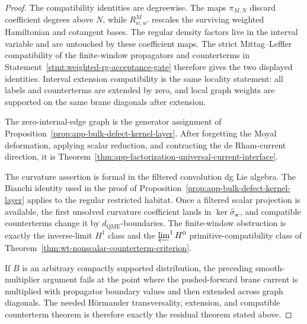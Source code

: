 \begin{proof}
  The compatibility identities are degreewise.  The maps \(\pi_{M,N}\)
  discard coefficient degrees above \(N\), while \(R^M_{w,w'}\) rescales
  the surviving weighted Hamiltonian and cotangent bases.  The regular
  density factors live in the interval variable and are untouched by these
  coefficient maps.  The strict Mittag--Leffler compatibility of the
  finite-window propagators and counterterms in
  Statement~\ref{stmt:weighted-rg-acceptance-gate} therefore gives the two
  displayed identities.  Interval extension compatibility is the same
  locality statement: all labels and counterterms are extended by zero, and
  local graph weights are supported on the same brane diagonals after
  extension.

  The zero-internal-edge graph is the generator assignment of
  Proposition~\ref{prop:app-bulk-defect-kernel-layer}.  After forgetting
  the Moyal deformation, applying scalar reduction, and contracting the
  de Rham-current direction, it is
  Theorem~\ref{thm:app-factorization-universal-current-interface}.

  The curvature assertion is formal in the filtered convolution dg Lie
  algebra.  The Bianchi identity used in the proof of
  Proposition~\ref{prop:app-bulk-defect-kernel-layer} applies to the
  regular restricted habitat.  Once a filtered scalar projection is
  available, the first unsolved curvature coefficient lands in
  \(\ker\widehat\sigma_{\mathrm{sc}}\), and compatible counterterms change
  it by \(d_{\mathrm{QME}}\)-boundaries.  The finite-window obstruction is
  exactly the inverse-limit \(H^1\) class and the
  \(\varprojlim^1H^0\) primitive-compatibility class of
  Theorem~\ref{thm:wt-nonscalar-counterterm-criterion}.

  If \(B\) is an arbitrary compactly supported distribution, the preceding
  smooth-multiplier argument fails at the point where the pushed-forward
  brane current is multiplied with propagator boundary values and then
  extended across graph diagonals.  The needed H\"ormander
  transversality, extension, and compatible counterterm theorem is
  therefore exactly the residual theorem stated above.
\end{proof}

